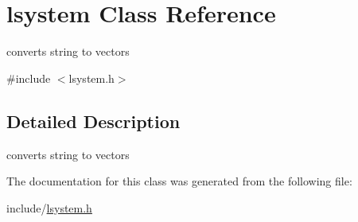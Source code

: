 \hypertarget{classlsystem}{
\section{lsystem Class Reference}
\label{classlsystem}
}


converts string to vectors  


{\ttfamily \#include $<$lsystem.h$>$}

\subsection{Detailed Description}
converts string to vectors 

The documentation for this class was generated from the following file:\begin{DoxyCompactItemize}
\item 
include/\hyperlink{lsystem_8h}{lsystem.h}\end{DoxyCompactItemize}
